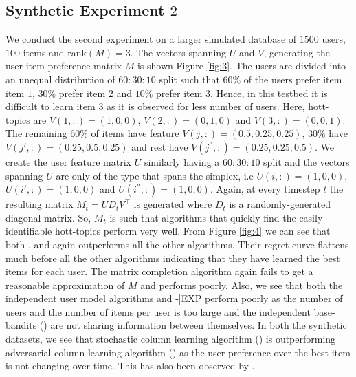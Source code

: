 \subsection{Synthetic Experiment $2$}
We conduct the second experiment on a larger simulated database of $1500$ users, $100$ items and rank$(M)=3$. The vectors spanning $U$ and $V$, generating the user-item preference matrix $M$ is shown Figure \ref{fig:3}. The users are divided into an unequal distribution of $60:30:10$ split such that $60\%$ of the users prefer item item $1$, $30\%$ prefer item $2$ and $10\%$ prefer item $3$. Hence, in this testbed it is difficult to learn item $3$ as it is observed for less number of users. Here, hott-topics are $V(1,:) = (1,0,0)$, $V(2,:) = (0,1, 0)$ and $V(3,:) = (0,0,1)$. The remaining $60\%$ of items have feature  $V(j,:) = (0.5, 0.25,0.25)$, $30\%$ have $V(j',:) = (0.25, 0.5, 0.25)$ and rest have $V(j^{''},:) = (0.25, 0.25, 0.5)$. We create the user feature matrix $U$ similarly having a $60:30:10$ split and the vectors spanning $U$ are only of the type that spans the simplex, i.e $U(i,:)=(1,0,0)$, $U(i',:)=(1,0,0)$ and $U(i^{''},:)=(1,0,0)$. Again, at every timestep $t$ the resulting matrix $M_t =UD_tV^{\intercal}$ is generated where $D_t$ is a randomly-generated diagonal matrix. So, $M_t$ is  such that algorithms that quickly find the easily identifiable hott-topics perform very well. From Figure \ref{fig:4} we can see that both \LRAEXP, \LRATS and \LRAUCB again outperforms all the other algorithms. Their regret curve flattens much before all the other algorithms indicating that they have learned the best items for each user. The matrix completion algorithm \NMFBan again fails to get a reasonable approximation of $M$ and performs poorly. Also, we see that both the independent user model algorithms \RBAUCB and \RBA-]EXP perform poorly as the number of users and the number of items per user is too large and the independent base-bandits (\RBA) are not sharing information between themselves. In both the synthetic datasets, we see that stochastic column learning algorithm (\ucb) is outperforming adversarial column learning algorithm (\expthree) as the user preference over the best item is not changing over time. This has also been observed by \citet{radlinski2008learning}.



